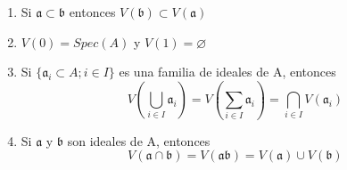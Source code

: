 \documentclass[14pt]{extarticle}
\begin{document}
\begin{lema}{}{}
    \begin{enumerate}
        \item Si $\mathfrak{a} \subset \mathfrak{b}$ entonces $V(\mathfrak{b}) \subset V(\mathfrak{a})$
        \item $V(0)=Spec(A)$ y $V(1)=\varnothing$
        \item Si $\{\mathfrak{a}_{i} \subset A ; i\in I\}$ es una familia de ideales de A, entonces 
        $$V\left( \bigcup_{i\in I} \mathfrak{a}_i\right) 
        = V\left( \sum_{i\in I}\mathfrak{a}_i\right) 
        = \bigcap_{i\in I} V(\mathfrak{a}_i)$$
        \item Si $\mathfrak{a}$ y $\mathfrak{b}$ son ideales de A, entonces
        $$V(\mathfrak{a}\cap \mathfrak{b}) = V(\mathfrak{a} \mathfrak{b}) = V(\mathfrak{a})\cup V(\mathfrak{b}) $$
    \end{enumerate}
\end{lema}
\end{document}
